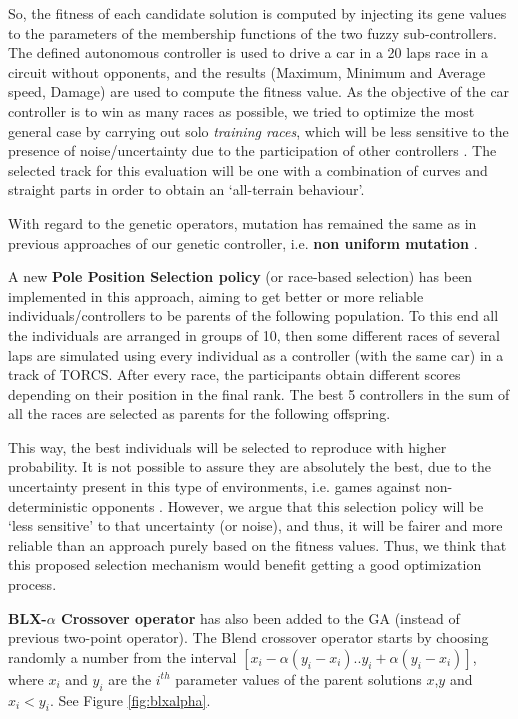 \documentclass[10pt,journal,compsoc]{IEEEtran}
\begin{document}
So, the fitness of each candidate solution is computed by injecting its gene values to the parameters of the membership functions of the two fuzzy sub-controllers. The defined autonomous controller is used to drive a
car in a 20 laps race in a circuit without opponents, and the results (Maximum, Minimum and Average speed, Damage) are used to compute the fitness value. 
As the objective of the car controller is to win as many races as
possible, we tried to optimize the most general case by carrying out solo {\em training races}, which will be less sensitive to the presence of noise/uncertainty due to the participation of other controllers \cite{merelo2016statistical}.
The selected track for this evaluation will be one with a combination of curves and straight parts in order to obtain an `all-terrain behaviour'.

With regard to the genetic operators, mutation has remained the same as in previous approaches of our genetic controller, i.e. \textbf{non uniform mutation} \cite{mutation1997}. 

A new \textbf{Pole Position Selection policy} (or race-based selection) has been implemented in this approach, aiming to get better or more reliable individuals/controllers to be parents of the following population. To this end all the individuals are arranged in groups of 10, then some different races of  several laps are simulated using every individual as a controller (with the same car) in a track of TORCS. After every race, the participants obtain different scores depending on their position in the final rank. The best 5 controllers in the sum of all the races are selected as parents for the following offspring.

This way, the best individuals will be selected to reproduce with higher probability. It is not possible to assure they are absolutely the best, due to the uncertainty present in this type of environments, i.e. games against non-deterministic opponents \cite{merelo2016statistical}. However, we argue that this selection policy will be `less sensitive' to that uncertainty (or noise), and thus, it will be fairer and more reliable than an approach purely based on the fitness values. Thus, we think that this proposed selection mechanism would benefit getting a good optimization process.


\textbf{BLX-$\alpha$ Crossover operator} \cite{blx2008} has also been added to the GA (instead of previous two-point operator). 
The Blend crossover operator starts by choosing randomly a number from the interval $[x_i-\alpha(y_i-x_i).. y_i+\alpha(y_i-x_i)]$, where $x_i$ and $y_i$ are the
$i^{th}$ parameter values of the parent solutions $x$,$y$ and $x_i < y_i$. See Figure \ref{fig:blxalpha}.
\end{document}
